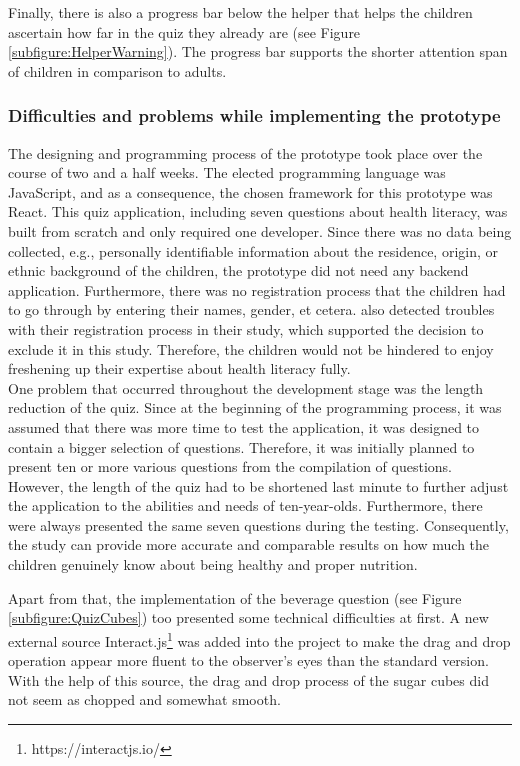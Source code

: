 Finally, there is also a progress bar below the helper that helps the children ascertain how far in the quiz they already are (see Figure \ref{subfigure:HelperWarning}). The progress bar supports the shorter attention span of children in comparison to adults.

\subsubsection{Difficulties and problems while implementing the prototype}
The designing and programming process of the prototype took place over the course of two and a half weeks. The elected programming language was JavaScript, and as a consequence, the chosen framework for this prototype was React. This quiz application, including seven questions about health literacy, was built from scratch and only required one developer. 
Since there was no data being collected, e.g., personally identifiable information about the residence, origin, or ethnic background of the children, the prototype did not need any backend application. Furthermore, there was no registration process that the children had to go through by entering their names, gender, et cetera. \textcite{alhussayen2015evaluating} also detected troubles with their registration process in their study, which supported the decision to exclude it in this study. Therefore, the children would not be hindered to enjoy freshening up their expertise about health literacy fully.\\
One problem that occurred throughout the development stage was the length reduction of the quiz. Since at the beginning of the programming process, it was assumed that there was more time to test the application, it was designed to contain a bigger selection of questions. Therefore, it was initially planned to present ten or more various questions from the compilation of questions. However, the length of the quiz had to be shortened last minute to further adjust the application to the abilities and needs of ten-year-olds. Furthermore, there were always presented the same seven questions during the testing. Consequently, the study can provide more accurate and comparable results on how much the children genuinely know about being healthy and proper nutrition. 

Apart from that, the implementation of the beverage question (see Figure \ref{subfigure:QuizCubes}) too presented some technical difficulties at first. A new external source Interact.js\footnote{https://interactjs.io/} was added into the project to make the drag and drop operation appear more fluent to the observer's eyes than the standard version. With the help of this source, the drag and drop process of the sugar cubes did not seem as chopped and somewhat smooth. 

